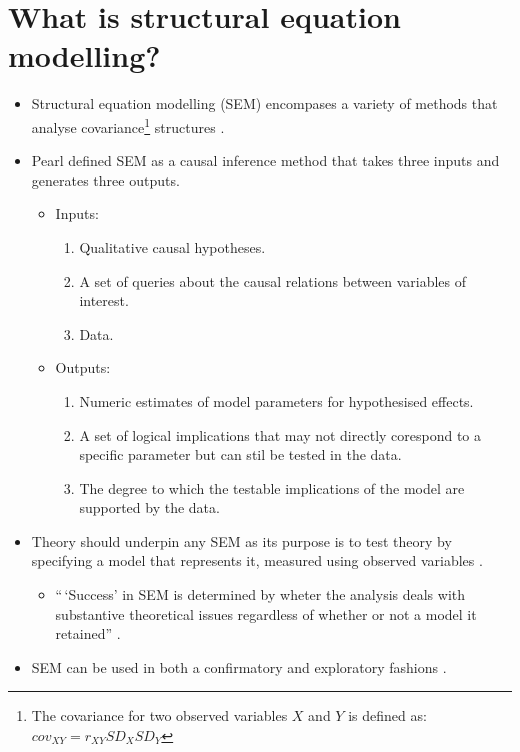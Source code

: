 \documentclass[
  a4paper,
  DIV=11,
  numbers=noendperiod]{scrreprt}
\providecommand{\tightlist}{%
  \setlength{\itemsep}{0pt}\setlength{\parskip}{0pt}}\usepackage{longtable,booktabs,array}
\begin{document}
\section{What is structural equation
modelling?}\label{what-is-structural-equation-modelling}

\begin{itemize}
\item
  Structural equation modelling (SEM) encompases a variety of methods
  that analyse covariance\footnote{The covariance for two observed
    variables \(X\) and \(Y\) is defined as:
    \(cov_{XY} = r_{XY}SD_{X}SD_{Y}\)} structures \citep{Kline2016}.
\item
  Pearl \citeyearpar{Pearl2012} defined SEM as a causal inference method
  that takes three inputs and generates three outputs.

  \begin{itemize}
  \tightlist
  \item
    Inputs:

    \begin{enumerate}
    \def\labelenumi{(\alph{enumi})}
    \tightlist
    \item
      Qualitative causal hypotheses.
    \item
      A set of queries about the causal relations between variables of
      interest.
    \item
      Data.
    \end{enumerate}
  \item
    Outputs:

    \begin{enumerate}
    \def\labelenumi{(\alph{enumi})}
    \tightlist
    \item
      Numeric estimates of model parameters for hypothesised effects.
    \item
      A set of logical implications that may not directly corespond to a
      specific parameter but can stil be tested in the data.
    \item
      The degree to which the testable implications of the model are
      supported by the data.
    \end{enumerate}
  \end{itemize}
\item
  Theory should underpin any SEM as its purpose is to test theory by
  specifying a model that represents it, measured using observed
  variables \citep{Hayduk2007}.

  \begin{itemize}
  \tightlist
  \item
    ``\,`Success' in SEM is determined by wheter the analysis deals with
    substantive theoretical issues regardless of whether or not a model
    it retained'' \citep[ pp 9-10]{Kline2016}.
  \end{itemize}
\item
  SEM can be used in both a confirmatory and exploratory fashions
  \citep{Joreskog1993}.


\end{itemize}
\end{document}
